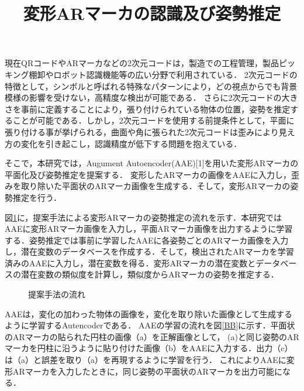 \documentclass{jsarticle}
\title{変形ARマーカの認識及び姿勢推定}
\begin{document}
\maketitle

現在QRコードやARマーカなどの2次元コードは，製造での工程管理，製品ピッキング棚卸やロボット認識機能等の広い分野で利用されている．
2次元コードの特徴として，シンボルと呼ばれる特殊なパターンにより，どの視点からでも背景模様の影響を受けない，高精度な検出が可能である．
さらに2次元コードの大きさを事前に定義することにより，張り付けられている物体の位置，姿勢を推定することが可能である．しかし，2次元コードを使用する前提条件として，平面に張り付ける事が挙げられる，曲面や角に張られた2次元コードは歪みにより見え方の変化を引き起こし，認識精度が低下する問題を抱えている．

そこで，本研究では，Augument Autoencoder(AAE)[1]を用いた変形ARマーカの平面化及び姿勢推定を提案する．
変形したARマーカの画像をAAEに入力し，歪みを取り除いた平面状のARマーカ画像を生成する．そして，変形ARマーカの姿勢推定を行う．


図\ref{flow}に，提案手法による変形ARマーカの姿勢推定の流れを示す．本研究ではAAEに変形ARマーカ画像を入力し，平面ARマーカ画像を出力するように学習する．姿勢推定では事前に学習したAAEに各姿勢ごとのARマーカ画像を入力し，潜在変数のデータベースを作成する．そして，検出されたARマーカを学習済みのAAEに入力し，潜在変数を得る．変形ARマーカの潜在変数とデータベースの潜在変数の類似度を計算し，類似度からARマーカの姿勢を推定する．

\begin{figure}[ht]
\vspace{-5zh}
\setlength{\epsfxsize}{6.5cm}
\centerline{}
\vspace{4.5zh}
\caption{提案手法の流れ}
\label{flow}
\vspace{-1.0zh}
\end{figure}

AAEは，変化の加わった物体の画像を，変化を取り除いた画像として生成するように学習するAutencoderである．
AAEの学習の流れを図\ref{BB}に示す．平面状のARマーカの貼られた円柱の画像（a）を正解画像として，
(a)と同じ姿勢のARマーカを円柱に沿うように貼り付けた画像（b）をAAEに入力する．出力（c）は（a）と誤差を取り（a）を再現するように学習を行う．
これによりAAEに変形ARマーカを入力したときに，同じ姿勢の平面状のARマーカを出力可能になる．
\end{document}
